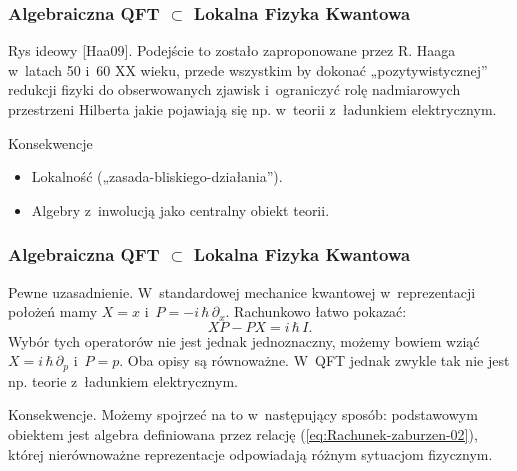 \documentclass[10pt,t]{beamer}
\begin{document}
\begin{frame}
  \frametitle{Algebraiczna QFT $\subset$ Lokalna Fizyka Kwantowa}


  Rys ideowy [Haa09]. Podejście to zostało zaproponowane przez R. Haaga
  w~latach 50 i~60 XX wieku, przede wszystkim by dokonać „pozytywistycznej”
  redukcji fizyki do obserwowanych zjawisk i~ograniczyć rolę
  nadmiarowych przestrzeni Hilberta jakie pojawiają się np. w~teorii
  z~ładunkiem elektrycznym.

  Konsekwencje
  \begin{itemize}
    \RaggedRight

  \item Lokalność („zasada-bliskiego-działania”).

  \item Algebry z~inwolucją jako centralny obiekt teorii.

  \end{itemize}

\end{frame}





\begin{frame}
  \frametitle{Algebraiczna QFT $\subset$ Lokalna Fizyka Kwantowa}


  Pewne uzasadnienie. W~standardowej mechanice kwantowej w~reprezentacji
  położeń mamy $X = x$ i~$P = -i \, \hbar \, \partial_{ x }$. Rachunkowo łatwo pokazać:
  \begin{equation}
    \label{eq:Rachunek-zaburzen-02}
    XP - PX = i \, \hbar \, I.
  \end{equation}
  Wybór tych operatorów nie jest jednak jednoznaczny, możemy bowiem
  wziąć $X = i \, \hbar \, \partial_{ p }$ i~$P = p$. Oba opisy są równoważne. W~QFT
  jednak zwykle tak nie jest np. teorie z~ładunkiem elektrycznym.

  Konsekwencje. Możemy spojrzeć na to w~następujący sposób: podstawowym
  obiektem jest algebra definiowana przez relację
  (\ref{eq:Rachunek-zaburzen-02}), której nierównoważne reprezentacje
  odpowiadają różnym sytuacjom fizycznym.

\end{frame}
\end{document}

